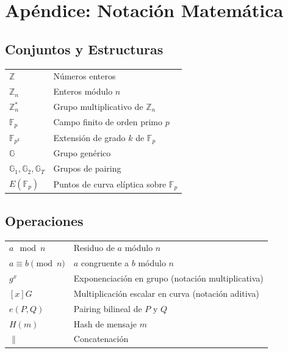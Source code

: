 \documentclass[11pt,a4paper,twoside,openright]{book}
\theoremstyle{definition}
\theoremstyle{plain}
\theoremstyle{remark}
\begin{document}
\chapter*{Apéndice: Notación Matemática}

\section*{Conjuntos y Estructuras}
\begin{tabular}{ll}
$\mathbb{Z}$ & Números enteros \\
$\mathbb{Z}_n$ & Enteros módulo $n$ \\
$\mathbb{Z}_n^*$ & Grupo multiplicativo de $\mathbb{Z}_n$ \\
$\mathbb{F}_p$ & Campo finito de orden primo $p$ \\
$\mathbb{F}_{p^k}$ & Extensión de grado $k$ de $\mathbb{F}_p$ \\
$\mathbb{G}$ & Grupo genérico \\
$\mathbb{G}_1, \mathbb{G}_2, \mathbb{G}_T$ & Grupos de pairing \\
$E(\mathbb{F}_p)$ & Puntos de curva elíptica sobre $\mathbb{F}_p$ \\
\end{tabular}

\section*{Operaciones}
\begin{tabular}{ll}
$a \mod n$ & Residuo de $a$ módulo $n$ \\
$a \equiv b \pmod{n}$ & $a$ congruente a $b$ módulo $n$ \\
$g^x$ & Exponenciación en grupo (notación multiplicativa) \\
$[x]G$ & Multiplicación escalar en curva (notación aditiva) \\
$e(P, Q)$ & Pairing bilineal de $P$ y $Q$ \\
$H(m)$ & Hash de mensaje $m$ \\
$\|$ & Concatenación \\
\end{tabular}
\end{document}
